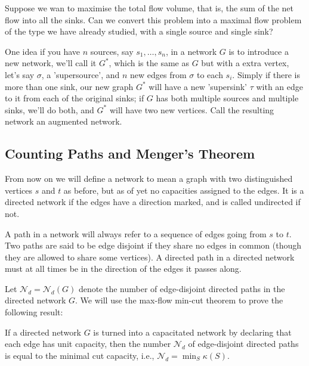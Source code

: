 \documentclass[10pt, a4paper]{article}
\begin{document}
Suppose we wan to maximise the total flow volume,
that is,
the sum of the net flow into all the sinks.
Can we convert this problem into a maximal flow problem of the type we have already studied,
with a single source and single sink?

One idea if you have $n$ sources,
say $s_1, \dotsc, s_n$,
in a network $G$ is to introduce a new network,
we'll call it $G ^ {*}$,
which is the same as $G$ but with a extra vertex,
let's say $\sigma$,
a 'supersource',
and $n$ new edges from $\sigma$ to each $s_i$.
Simply if there is more than one sink,
our new graph $G ^ {*}$ will have a new 'supersink' $\tau$ with an edge to it from each of the original sinks;
if $G$ has both multiple sources and multiple sinks,
we'll do both,
and $G ^ {*}$ will have two new vertices.
Call the resulting network an augmented network.

\subsection{Counting Paths and Menger's Theorem}
From now on we will define a network to mean a graph with two distinguished vertices $s$ and $t$ as before,
but as of yet no capacities assigned to the edges.
It is a directed network if the edges have a direction marked,
and is called undirected if not.

\begin{definition}
    A path in a network will always refer to a sequence of edges going from $s$ to $t$.
    Two paths are said to be edge disjoint if they share no edges in common
    (though they are allowed to share some vertices).
    A directed path in a directed network must at all times be in the direction of the edges it passes along.
\end{definition}

Let $\mathcal{N}_d = \mathcal{N}_d(G)$ denote the number of edge-disjoint directed paths in the directed network $G$.
We will use the max-flow min-cut theorem to prove the following result:

\begin{theorem}
    If a directed network $G$ is turned into a capacitated network by declaring that each edge has unit capacity,
    then the number $\mathcal{N}_d$ of edge-disjoint directed paths is equal to the minimal cut capacity,
    i.e.,
    $\mathcal{N}_d = \min_{S}\kappa(S)$.
\end{theorem}
\end{document}

